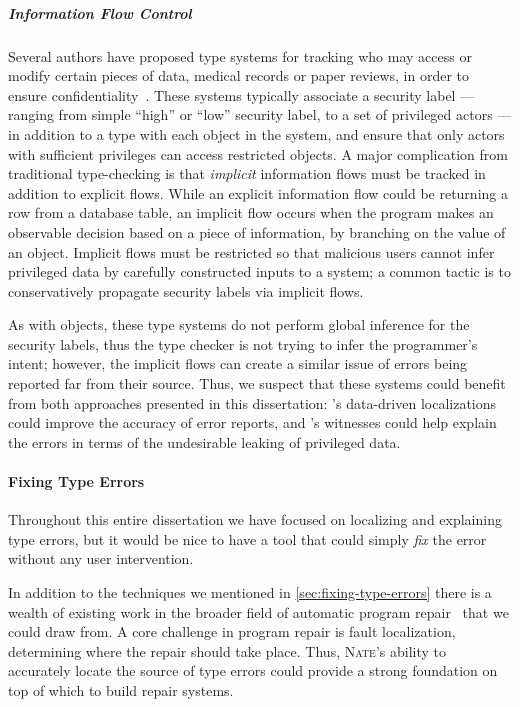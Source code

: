 
\subparagraph{Information Flow Control}
%
Several authors have proposed type systems for tracking who may access
or modify certain pieces of data, \eg medical records or paper reviews,
in order to ensure confidentiality~\citep{Denning1977-kk,Heintze1998-hu,Myers2000-zd,Pottier2003-et,Stefan2011-cd}.
%
These systems typically associate a security label --- ranging from
simple ``high'' or ``low'' security label, to a set of privileged actors
--- in addition to a type with each object in the system, and ensure
that only actors with sufficient privileges can access restricted
objects.
%
A major complication from traditional type-checking is that \emph{implicit}
information flows must be tracked in addition to explicit flows.
%
While an explicit information flow could be returning a row from a
database table, an implicit flow occurs when the program makes an
observable decision based on a piece of information, \eg by branching
on the value of an object.
%
Implicit flows must be restricted so that malicious users cannot infer
privileged data by carefully constructed inputs to a system;
%
a common tactic is to conservatively propagate security labels via
implicit flows.

As with objects, these type systems do not perform global inference for
the security labels, thus the type checker is not trying to infer the
programmer's intent; however, the implicit flows can create a similar
issue of errors being reported far from their source.
%
Thus, we suspect that these systems could benefit from both approaches
presented in this dissertation: 's data-driven localizations
could improve the accuracy of error reports, and 's
witnesses could help explain the errors in terms of the undesirable
leaking of privileged data.

\paragraph{Fixing Type Errors}
Throughout this entire dissertation we have focused on localizing and
explaining type errors, but %
it would be nice to have a tool that
could simply \emph{fix} the error without any user intervention.

In addition to the techniques we mentioned in
\autoref{sec:fixing-type-errors} there is a wealth of existing work in
the broader field of automatic program repair~\citep[see][\S~4, for a
survey]{Le_Goues2013-ag} that we could draw from.
%
A core challenge in program repair is fault localization, \ie
determining where the repair should take place.
%
Thus, \textsc{Nate}'s ability to accurately locate the source of type
errors could provide a strong foundation on top of which to build repair
systems.

